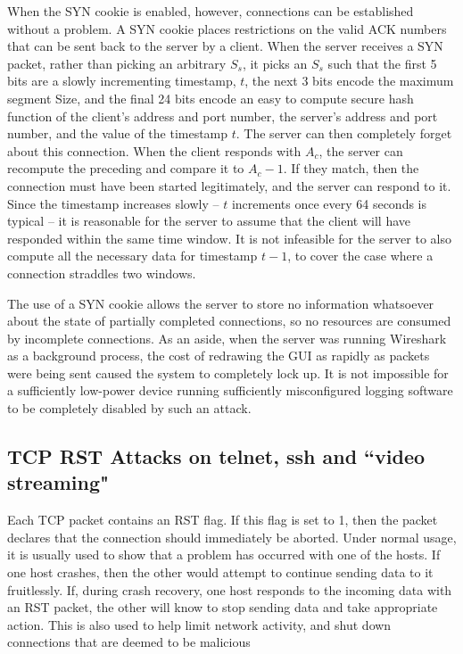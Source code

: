 When the SYN cookie is enabled, however, connections can be established without a problem. A SYN cookie places
restrictions on the valid ACK numbers that can be sent back to the server by a client. When the server receives a SYN
packet, rather than picking an arbitrary $S_s$, it picks an $S_s$ such that the first 5 bits are a slowly incrementing
timestamp, $t$, the next 3 bits encode the maximum segment Size, and the final 24 bits encode an easy to compute secure
hash function of the client's address and port number, the server's address and port number, and the value of the
timestamp $t$. The server can then completely forget about this connection. When the client responds with $A_c$, the
server can recompute the preceding and compare it to $A_c-1$. If they match, then the connection must have been started
legitimately, and the server can respond to it. Since the timestamp increases slowly -- $t$ increments once every 64
seconds is typical -- it is reasonable for the server to assume that the client will have responded within the same time
window. It is not infeasible for the server to also compute all the necessary data for timestamp $t-1$, to cover the
case where a connection straddles two windows.

The use of a SYN cookie allows the server to store no information whatsoever about the state of partially completed
connections, so no resources are consumed by incomplete connections. As an aside, when the server was running Wireshark
as a background process, the cost of redrawing the GUI as rapidly as packets were being sent caused the system to
completely lock up. It is not impossible for a sufficiently low-power device running sufficiently misconfigured logging
software to be completely disabled by such an attack.

\subsection{TCP RST Attacks on telnet, ssh and ``video streaming"}

Each TCP packet contains an RST flag. If this flag is set to 1, then the packet declares that the connection should
immediately be aborted. Under normal usage, it is usually used to show that a problem has occurred with one of the
hosts. If one host crashes, then the other would attempt to continue sending data to it fruitlessly. If, during crash
recovery, one host responds to the incoming data with an RST packet, the other will know to stop sending data and take
appropriate action. This is also used to help limit network activity, and shut down connections that are deemed to be
malicious

